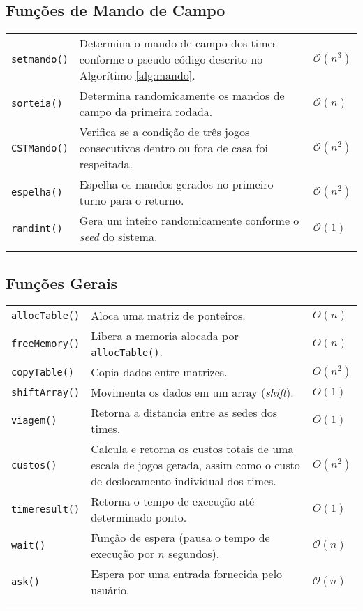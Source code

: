 \documentclass[12pt,a4paper]{article}
\numberwithin{figure}{section}
\numberwithin{table}{section}
\begin{document}
\subsection{Funções de Mando de Campo}

\begin{longtable}{p{3cm} p{11cm} p{1cm}}
	\texttt{setmando()} & Determina o mando de campo dos times conforme o pseudo-código descrito no Algorítimo \ref{alg:mando}. & $\mathcal{O}(n^3)$ \\
	\texttt{sorteia()} & Determina randomicamente os mandos de campo da primeira rodada. & $\mathcal{O}(n)$ \\
	\texttt{CSTMando()} & Verifica se a condição de três jogos consecutivos dentro ou fora de casa foi respeitada. & $\mathcal{O}(n^2)$ \\
	\texttt{espelha()} & Espelha os mandos gerados no primeiro turno para o returno. & $\mathcal{O}(n^2)$ \\
	\texttt{randint()} & Gera um inteiro randomicamente conforme o \textit{seed} do sistema. & $\mathcal{O}(1)$ \\
	\label{tab:mando}
\end{longtable}
\vspace{-0.5cm}

\subsection{Funções Gerais}

\begin{longtable}{p{3cm} p{11cm} p{1cm}}
	\texttt{allocTable()} & Aloca uma matriz de ponteiros. & $O(n)$ \\
	\texttt{freeMemory()} & Libera a memoria alocada por \texttt{allocTable()}. & $O(n)$ \\
	\texttt{copyTable()} & Copia dados entre matrizes. & $O(n^2)$ \\
	\texttt{shiftArray()} & Movimenta os dados em um array (\textit{shift}). & $O(1)$ \\
	\texttt{viagem()} & Retorna a distancia entre as sedes dos times. & $O(1)$ \\
	\texttt{custos()} & Calcula e retorna os custos totais de uma escala de jogos gerada, assim como o custo de deslocamento individual dos times. & $O(n^2)$ \\
	\texttt{timeresult()} & Retorna o tempo de execução até determinado ponto. & $O(1)$ \\
	\texttt{wait()} & Função de espera (pausa o tempo de execução por $n$ segundos). & $\mathcal{O}(n)$ \\
	\texttt{ask()} & Espera por uma entrada fornecida pelo usuário. & $\mathcal{O}(n)$ \\
	\label{tab:comum}
\end{longtable}
\end{document}
